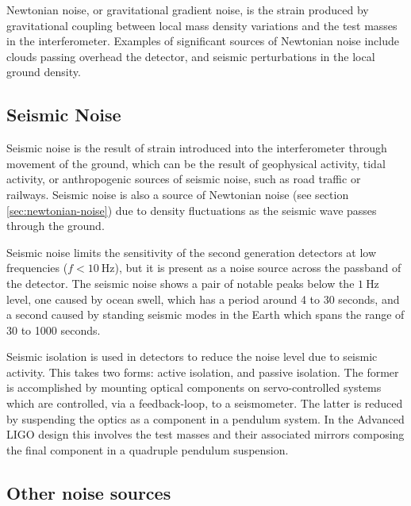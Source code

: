 \documentclass{kentigern}
\begin{document}
Newtonian noise, or gravitational gradient noise, is the strain
produced by gravitational coupling between local mass density
variations and the test masses in the interferometer. Examples of
significant sources of Newtonian noise include clouds passing overhead
the detector, and seismic perturbations in the local ground density.

\subsection{Seismic Noise}
\label{sec:seismic-noise}

Seismic noise is the result of strain introduced into the
interferometer through movement of the ground, which can be the result
of geophysical activity, tidal activity, or anthropogenic sources of
seismic noise, such as road traffic or railways. Seismic noise is also
a source of Newtonian noise (see section \ref{sec:newtonian-noise})
due to density fluctuations as the seismic wave passes through the
ground.


Seismic noise limits the sensitivity of the second generation
detectors at low frequencies ($f < \SI{10}{\hertz}$), but it is
present as a noise source across the passband of the detector. The
seismic noise shows a pair of notable peaks below the $\SI{1}{\hertz}$
level, one caused by ocean swell, which has a period around 4 to 30
seconds, and a second caused by standing seismic modes in the Earth
which spans the range of 30 to 1000 seconds.

Seismic isolation is used in detectors to reduce the noise level due
to seismic activity. This takes two forms: active isolation, and
passive isolation. The former is accomplished by mounting optical
components on servo-controlled systems which are controlled, via a
feedback-loop, to a seismometer. The latter is reduced by suspending
the optics as a component in a pendulum system. In the Advanced LIGO
design this involves the test masses and their associated mirrors
composing the final component in a quadruple pendulum suspension.



\subsection{Other noise sources}
\label{sec:other-noise-sources}
\end{document}
